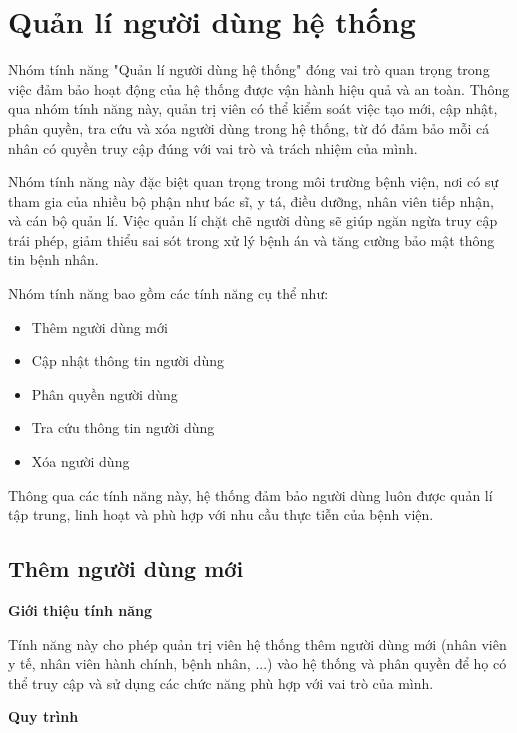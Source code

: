 \section{Quản lí người dùng hệ thống}

Nhóm tính năng "Quản lí người dùng hệ thống" đóng vai trò quan trọng trong việc đảm bảo hoạt động của hệ thống được vận hành hiệu quả và an toàn. Thông qua nhóm tính năng này, quản trị viên có thể kiểm soát việc tạo mới, cập nhật, phân quyền, tra cứu và xóa người dùng trong hệ thống, từ đó đảm bảo mỗi cá nhân có quyền truy cập đúng với vai trò và trách nhiệm của mình.

Nhóm tính năng này đặc biệt quan trọng trong môi trường bệnh viện, nơi có sự tham gia của nhiều bộ phận như bác sĩ, y tá, điều dưỡng, nhân viên tiếp nhận, và cán bộ quản lí. Việc quản lí chặt chẽ người dùng sẽ giúp ngăn ngừa truy cập trái phép, giảm thiểu sai sót trong xử lý bệnh án và tăng cường bảo mật thông tin bệnh nhân.

Nhóm tính năng bao gồm các tính năng cụ thể như:

\begin{itemize}
    \item Thêm người dùng mới
    \item Cập nhật thông tin người dùng 
    \item Phân quyền người dùng 
    \item Tra cứu thông tin người dùng 
    \item Xóa người dùng 
\end{itemize}

Thông qua các tính năng này, hệ thống đảm bảo người dùng luôn được quản lí tập trung, linh hoạt và phù hợp với nhu cầu thực tiễn của bệnh viện.

\subsection{Thêm người dùng mới} 

\noindent \textbf{Giới thiệu tính năng}

Tính năng này cho phép quản trị viên hệ thống thêm người dùng mới (nhân viên y tế, nhân viên hành chính, bệnh nhân, ...) vào hệ thống và phân quyền để họ có thể truy cập và sử dụng các chức năng phù hợp với vai trò của mình.

\noindent \textbf{Quy trình}

